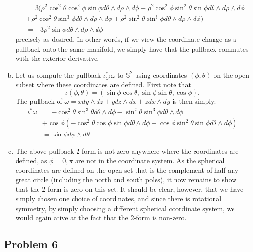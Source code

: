 \documentclass{../../mathnotes}
\begin{document}
\begin{enumerate}[(a)]
\begin{align*}
            &=3(\rho^2\cos^2\theta\cos^2\phi\sin\phi d\theta\wedge d\rho\wedge d\phi+\rho^2\cos^2\phi\sin^2\theta\sin\phi d\theta\wedge d\rho\wedge d\phi\\
            &+\rho^2\cos^2\theta\sin^3\phi d\theta\wedge d\rho \wedge d\phi+\rho^2\sin^2\theta\sin^3\phi d\theta\wedge d\rho\wedge d\phi)\\
            &=-3\rho^2\sin\phi d\theta\wedge d\rho \wedge d\phi
        \end{align*}
        precisely as desired. In other words, if we view the coordinate change as a pullback onto the same manifold, we simply have
        that the pullback commutes with the exterior derivative.
    \item Let us compute the pullback $\iota^*_{\mathbb{S}^2}\omega$ to $\mathbb{S}^2$ using coordinates $(\phi,\theta)$ on the
        open subset where these coordinates are defined. First note that
        \[\iota(\phi,\theta)=(\sin\phi\cos\theta,\sin\phi\sin\theta,\cos\phi).\]
        The pullback of $\omega=x dy\wedge dz+ydz\wedge dx+zdx\wedge dy$ is then simply:
        \begin{align*}
            \iota^*\omega&=-\cos^2\theta\sin^3\theta d\theta\wedge d\phi-\sin^2\theta\sin^3\phi d\theta\wedge d\phi\\
            &+\cos\phi\left( -\cos^2\theta\cos\phi\sin\phi d\theta\wedge d\phi-\cos\phi\sin^2\theta\sin\phi d\theta\wedge d\phi \right)\\
            &=\sin\phi d\phi\wedge d\theta
        \end{align*}
    \item 
        The above pullback 2-form is not zero anywhere where the coordinates are defined, as $\phi=0,\pi$ are not in the coordinate system.
        As the spherical coordinates are defined on the open set that is the complement of half any great circle (including
        the north and south poles), it now remains to show that the 2-form is zero on this set. It should be clear, however,
        that we have simply chosen one choice of coordinates, and since there is rotational symmetry, by simply choosing a different
        spherical coordinate system, we would again arive at the fact that the 2-form is non-zero.
\end{enumerate}


\subsection*{Problem 6}
\end{document}
